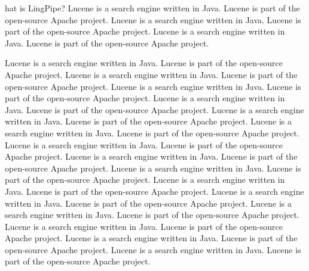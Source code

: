 

%
\setcounter{page}{1}%
%
\pagestyle{fancy}%

hat is LingPipe?
Lucene is a search engine written in Java.  Lucene is part of the
open-source Apache project.
Lucene is a search engine written in Java.  Lucene is part of the
open-source Apache project.
Lucene is a search engine written in Java.  Lucene is part of the
open-source Apache project.


\noindent
Lucene is a search engine written in Java.  Lucene is part of the
open-source Apache project.
Lucene is a search engine written in Java.  Lucene is part of the
open-source Apache project.
Lucene is a search engine written in Java.  Lucene is part of the
open-source Apache project.
Lucene is a search engine written in Java.  Lucene is part of the
open-source Apache project.
Lucene is a search engine written in Java.  Lucene is part of the
open-source Apache project.
Lucene is a search engine written in Java.  Lucene is part of the
open-source Apache project.
Lucene is a search engine written in Java.  Lucene is part of the
open-source Apache project.
Lucene is a search engine written in Java.  Lucene is part of the
open-source Apache project.
Lucene is a search engine written in Java.  Lucene is part of the
open-source Apache project.
Lucene is a search engine written in Java.  Lucene is part of the
open-source Apache project.
Lucene is a search engine written in Java.  Lucene is part of the
open-source Apache project.
Lucene is a search engine written in Java.  Lucene is part of the
open-source Apache project.
Lucene is a search engine written in Java.  Lucene is part of the
open-source Apache project.
Lucene is a search engine written in Java.  Lucene is part of the
open-source Apache project.
Lucene is a search engine written in Java.  Lucene is part of the
open-source Apache project.

